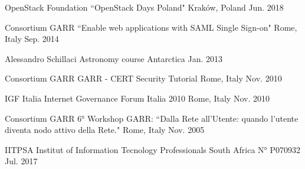 \begin{cvhonors}

\cvhonor
{OpenStack Foundation} %
{“OpenStack Days Poland"} %
{Kraków, Poland} %
{Jun. 2018} %


\cvhonor
{Consortium GARR} %
{“Enable web applications with SAML Single Sign-on"} %
{Rome, Italy} %
{Sep. 2014} %


\cvhonor
{Alessandro Schillaci} %
{Astronomy course} %
{Antarctica} %
{Jan. 2013} %


\cvhonor
{Consortium GARR} %
{GARR - CERT Security Tutorial} %
{Rome, Italy} %
{Nov. 2010} %


\cvhonor
{IGF Italia} %
{Internet Governance Forum Italia 2010} %
{Rome, Italy} %
{Nov. 2010} %

\cvhonor
{Consortium GARR} %
{6° Workshop GARR: “Dalla Rete all'Utente: quando l'utente diventa nodo attivo della Rete."} %
{Rome, Italy} %
{Nov. 2005} %

\end{cvhonors}



\begin{cvhonors}

\cvhonor
{IITPSA} %
{Institut of Information Tecnology Professionals South Africa} %
{N° P070932} %
{Jul. 2017} %


\end{cvhonors}